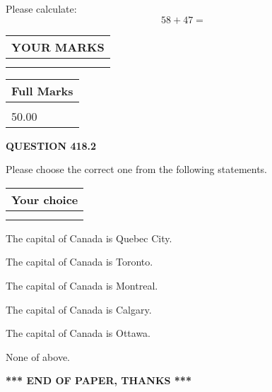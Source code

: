 \documentclass[12pt]{article}
\begin{document}
  
 
Please calculate:
\begin{equation}
58 +  %
47 = \nonumber
\end{equation}
 

 

 
  
\vspace{0.2in}
  
\noindent\begin{tabular}{|l|}
\hline
 YOUR MARKS  \\
\hline
 \\ 
 \\ 
\hline
\end{tabular}
\hspace{0.05in} \begin{tabular}{|l|}
\hline
 Full Marks  \\
\hline
 \\ 
50.00 \\
\hline
\end{tabular}
{\textbf{\Large{QUESTION
418.2 
}}}
  
  
Please choose the correct one from the following statements.
  
  
\noindent\hspace{3.0in} \begin{tabular}{|l|}
\hline
Your choice \\
\hline
 \\ 
 \\ 
\hline
\end{tabular}
  
  
 
 
The capital of Canada is Quebec City.
 
 
The capital of Canada is Toronto.
 
 
The capital of Canada is Montreal.
 
 
The capital of Canada is Calgary.
 
 
The capital of Canada is Ottawa.
 
 
 None of above.
 
 
   
   
 \vspace{0.2in}
 
   
   
   
   
\vspace{1.0in} 
{\textbf{\large{ *** END OF PAPER, THANKS *** }}} 
   
\end{document}
